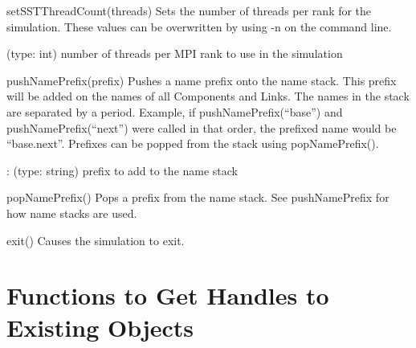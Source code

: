 \begin{functiondoc}{setSSTThreadCount(threads)}{
    Sets the number of threads per rank for the simulation.  These
    values can be overwritten by using -n on the command line.
}

   (type: int) number of threads per MPI rank to use in the
  simulation

  \noreturn
\end{functiondoc}

\begin{functiondoc}{pushNamePrefix(prefix)}{
    Pushes a name prefix onto the name stack.  This prefix will be
    added on the names of all Components and Links.  The names in the
    stack are separated by a period.  Example, if
    pushNamePrefix(“base”) and pushNamePrefix(“next”) were called in
    that order, the prefixed name would be “base.next”.  Prefixes can
    be popped from the stack using popNamePrefix().
}

  : (type: string) prefix to add to the name stack

  \noreturn
\end{functiondoc}


\begin{functiondoc}{popNamePrefix()}{
    Pops a prefix from the name stack.  See pushNamePrefix for how
    name stacks are used.
  }

  \noreturn
\end{functiondoc}


\begin{functiondoc}{exit()}{
    Causes the simulation to exit.
}

  \noreturn
\end{functiondoc}
  

\section{Functions to Get Handles to Existing Objects}
\label{sec:handles}


